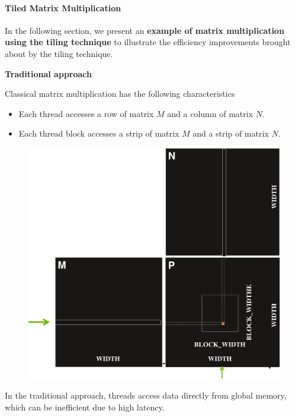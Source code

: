 \paragraph{Tiled Matrix Multiplication}

In the following section, we present an \textbf{example of matrix multiplication using the tiling technique} to illustrate the efficiency improvements brought about by the tiling technique.

\highspace
\begin{flushleft}
    \textcolor{Green3}{ \textbf{Traditional approach}}
\end{flushleft}
Classical matrix multiplication has the following characteristics
\begin{itemize}
    \item Each thread accesses a row of matrix $M$ and a column of matrix $N$.
    \item Each thread block accesses a strip of matrix $M$ and a strip of matrix $N$.
\end{itemize}
\begin{figure}[!htp]
    \centering
    \includegraphics[width=.8\textwidth]{img/cuda-matrix-multiplication-1.pdf}
\end{figure}
In the traditional approach, threads access data directly from global memory, which can be inefficient due to high latency.

